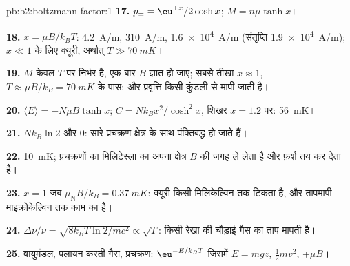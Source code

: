 \begin{solution}{pb:b2:boltzmann-factor:1}
\textbf{17.} $p_\pm = \eu^{\pm x}/2\cosh x$; $M = n\mu\tanh x$।

\textbf{18.} $x = \mu B/k_BT$: \qty{4.2}{A/m}, \qty{310}{A/m}, \qty{1.6e4}{A/m}
(संतृप्ति \qty{1.9e4}{A/m}); $x \ll 1$ के लिए क्यूरी, अर्थात् $T \gg \qty{70}{mK}$।

\textbf{19.} $M$ केवल $T$ पर निर्भर है, एक बार $B$ ज्ञात हो जाए; सबसे तीखा
$x \approx 1$, $T \approx \mu B/k_B = \qty{70}{mK}$ के पास; और प्रवृत्ति किसी कुंडली से
मापी जाती है।

\textbf{20.} $\langle E\rangle = -N\mu B\tanh x$; $C = Nk_Bx^2/\cosh^2x$, शिखर
$x = 1.2$ पर: \qty{56}{mK}।

\textbf{21.} $Nk_B\ln 2$ और $0$: सारे प्रचक्रण क्षेत्र के साथ पंक्तिबद्ध हो जाते हैं।

\textbf{22.} \qty{10}{mK}; प्रचक्रणों का मिलिटेस्ला का अपना क्षेत्र $B$ की जगह
ले लेता है और फ़र्श तय कर देता है।

\textbf{23.} $x = 1$ जब $\mu_{\text{N}}B/k_B = \qty{0.37}{mK}$: क्यूरी किसी
मिलिकेल्विन तक टिकता है, और तापमापी माइक्रोकेल्विन तक काम का है।

\textbf{24.} $\Delta\nu/\nu = \sqrt{8k_BT\ln2/mc^2} \propto \sqrt T$: किसी रेखा की
चौड़ाई गैस का ताप मापती है।

\textbf{25.} वायुमंडल, पलायन करती गैस, प्रचक्रण: $\eu^{-E/k_BT}$ जिसमें $E = mgz$,
$\tfrac12mv^2$, $\mp\mu B$।
\end{solution}
